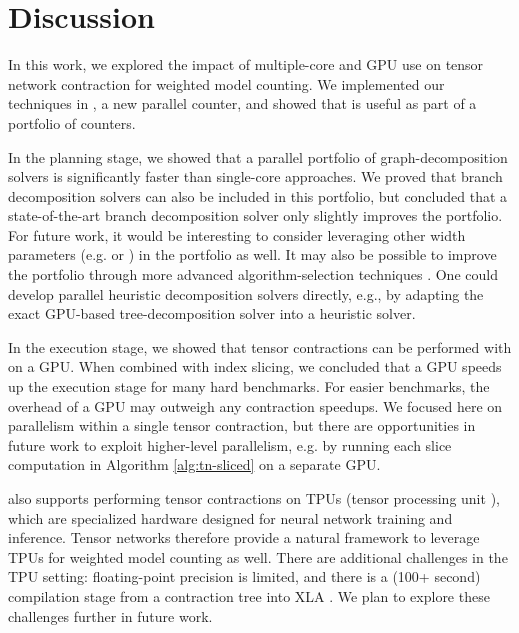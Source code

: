 \section{Discussion}
In this work, we explored the impact of multiple-core and GPU use on tensor network contraction for weighted model counting. We implemented our techniques in , a new parallel counter, and showed that  is useful as part of a portfolio of counters.

In the planning stage, we showed that a parallel portfolio of graph-decomposition solvers is significantly faster than single-core approaches. We proved that branch decomposition solvers can also be included in this portfolio, but concluded that a state-of-the-art branch decomposition solver only slightly improves the portfolio. For future work, it would be interesting to consider leveraging other width parameters (e.g. \cite{AGG07} or \cite{GS17}) in the portfolio as well. It may also be possible to improve the portfolio through more advanced algorithm-selection techniques \cite{HHLKS09,XHHL12}. One could develop parallel heuristic decomposition solvers directly, e.g., by adapting the exact GPU-based tree-decomposition solver \cite{VB17} into a heuristic solver.

In the execution stage, we showed that tensor contractions can be performed with  on a GPU. When combined with index slicing, we concluded that a GPU speeds up the execution stage for many hard benchmarks. For easier benchmarks, the overhead of a GPU may outweigh any contraction speedups. We focused here on parallelism within a single tensor contraction, but there are opportunities in future work to exploit higher-level parallelism, e.g. by running each slice computation in Algorithm \ref{alg:tn-sliced} on a separate GPU. 

 also supports performing tensor contractions on TPUs (tensor processing unit \cite{JYPPABBBBB17}), which are specialized hardware designed for neural network training and inference. Tensor networks therefore provide a natural framework to leverage TPUs for weighted model counting as well. There are additional challenges in the TPU setting: floating-point precision is limited, and there is a (100+ second) compilation stage from a contraction tree into XLA \cite{XLA}. We plan to explore these challenges further in future work.
